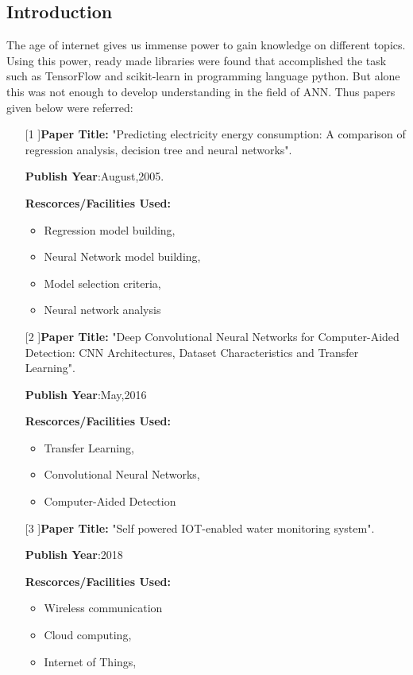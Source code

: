 \documentclass[12pt,times,a4paper]{report}
\begin{document}
{{\begin{normalsize}
\section{Introduction}
\par
The age of internet gives us immense power to gain knowledge on different topics. Using this power, ready made libraries were found that accomplished the task such as TensorFlow and scikit-learn in programming language python. But alone this was not enough to develop understanding in the field of ANN. Thus papers given below were referred: 
\begin{itemize}
\item[[1]]\textbf{Paper Title:} "Predicting electricity energy consumption: A comparison of regression
analysis, decision tree and neural networks".
\par
\textbf{Publish Year}:August,2005.
\par
\textbf{Rescorces/Facilities Used:}
\begin{itemize}
    \item 	Regression model building,
	\item Neural Network model building,
\item Model selection criteria,
\item Neural network analysis
\end{itemize}
\item[[2]]\textbf{Paper Title:} "Deep Convolutional Neural Networks for Computer-Aided Detection: CNN Architectures, Dataset Characteristics and Transfer Learning".
\par
\textbf{Publish Year}:May,2016
\par
\textbf{Rescorces/Facilities Used:}
\begin{itemize}
    \item Transfer Learning,
\item Convolutional Neural Networks,
\item Computer-Aided Detection
\end{itemize}
\item[[3]]\textbf{Paper Title:} "Self powered IOT-enabled water monitoring system".
\par
\textbf{Publish Year}:2018
\par
\textbf{Rescorces/Facilities Used:}
\begin{itemize}
    \item 	Wireless communication
\item	Cloud computing,
\item	Internet of Things,

\end{itemize}
\end{itemize}
\end{normalsize}}}
\end{document}
